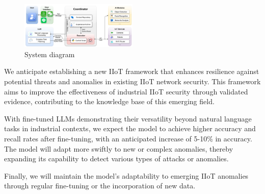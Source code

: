 \documentclass[usenatbib]{tjaa}
\begin{document}
\begin{figure}
  \centering
  \includegraphics[width=0.5\textwidth]{./img/system_diagram.png} %
  \caption{System diagram}
  \label{fig:llmFramwork}
\end{figure}

We anticipate establishing a new IIoT framework that enhances resilience against
potential threats and anomalies in existing IIoT network security.
This framework aims to improve the effectiveness of industrial IIoT
security through validated evidence, contributing to the knowledge
base of this emerging field.

With fine-tuned LLMs demonstrating their versatility beyond
natural language tasks in industrial contexts, we expect the model
to achieve higher accuracy and recall rates after fine-tuning,
with an anticipated increase of 5-10\% in accuracy.
The model will adapt more swiftly to new or complex anomalies,
thereby expanding its capability to detect various types of
attacks or anomalies.

Finally, we will maintain the model’s adaptability to
emerging IIoT anomalies through regular fine-tuning or
the incorporation of new data.


\end{document}
